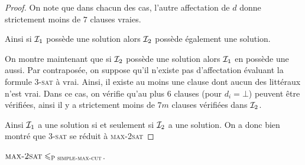 \documentclass{standalone}
\begin{document}
\begin{proof}
	On note que dans chacun des cas, l'autre affectation de $d$ donne strictement moins de $7$ clauses vraies.
	
	Ainsi si $\Irond_1$ possède une solution alors $\Irond_2$ possède également une solution.
	
	On montre maintenant que si $\Irond_2$ possède une solution alors $\Irond_1$ en possède une aussi. Par contraposée, on suppose qu'il n'existe pas d'affectation évaluant la formule \textsc{3-sat} à vrai. Ainsi, il existe au moins une clause dont aucun des littéraux n'est vrai. Dans ce cas, on vérifie qu'au plus $6$ clauses (pour $d_i = \bot$) peuvent être vérifiées, ainsi il y a strictement moins de $7m$ clauses vérifiées dans $\Irond_2$.
	
	Ainsi $\Irond_1$ a une solution si et seulement si $\Irond_2$ a une solution. On a donc bien montré que \textsc{3-sat} se réduit à \textsc{max-2sat}	
\end{proof}

\begin{thm}
	$\textsc{max-2sat} \leq_\textsc{P simple-max-cut}$.
\end{thm}
\end{document}
